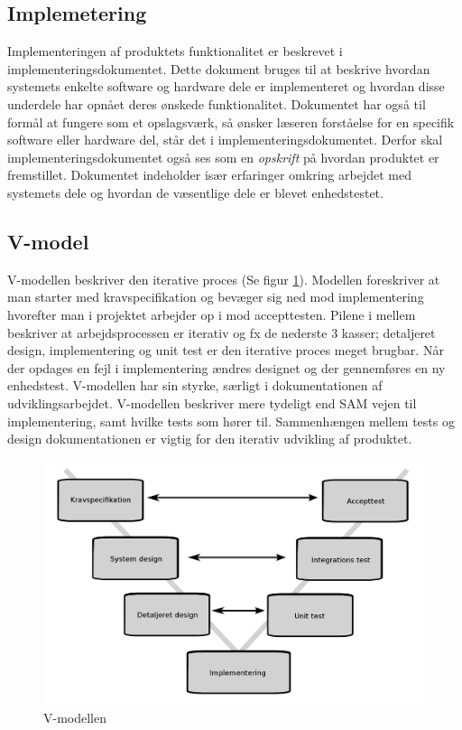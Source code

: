 	\subsection{Implemetering} \label{title:implementering}
	Implementeringen af produktets funktionalitet er beskrevet i implementeringsdokumentet. Dette dokument bruges til at beskrive hvordan systemets enkelte software og hardware dele er implementeret og hvordan disse underdele har opnået deres ønskede funktionalitet. Dokumentet har også til formål at fungere som et opslagsværk, så ønsker læseren forståelse for en specifik software eller hardware del, står det i implementeringsdokumentet. Derfor skal implementeringsdokumentet også ses som en \textit{opskrift} på hvordan produktet er fremstillet. Dokumentet indeholder især erfaringer omkring arbejdet med systemets dele og hvordan de væsentlige dele er blevet enhedstestet. 

\subsection{V-model}
V-modellen beskriver den iterative proces (Se figur \ref{fig:vmodel}). Modellen foreskriver at man starter med kravspecifikation og bevæger sig ned mod implementering hvorefter man i projektet arbejder op i mod accepttesten. Pilene i mellem beskriver at arbejdsprocessen er iterativ og fx de nederste 3 kasser; detaljeret design, implementering og unit test er den iterative proces meget brugbar. Når der opdages en fejl i implementering ændres designet og der gennemføres en ny enhedstest.  V-modellen har sin styrke, særligt i dokumentationen af udviklingsarbejdet. V-modellen beskriver mere tydeligt end SAM vejen til implementering, samt hvilke tests som hører til. Sammenhængen mellem tests og design dokumentationen er vigtig for den iterativ udvikling af produktet.
\begin{figure}[H]
	\includegraphics[width = \textwidth]{billeder/Vmodel.png}
	\caption{V-modellen}\label{fig:vmodel}
\end{figure}

